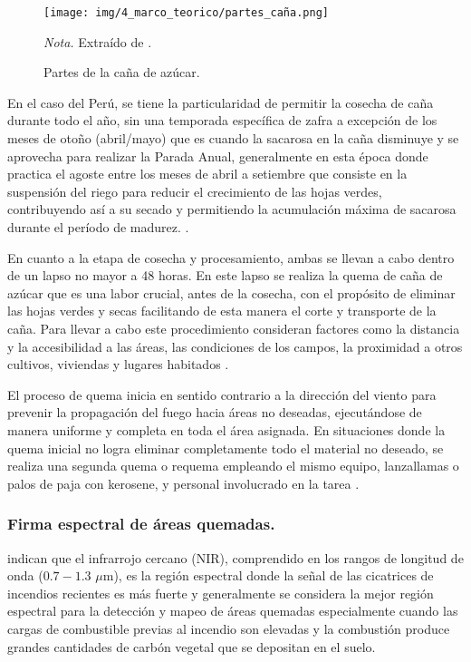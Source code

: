 \begin{figure}[H]
    \centering
    \caption{Partes de la caña de azúcar.}
    \texttt{[image: img/4\_marco\_teorico/partes\_caña.png]}
    \label{fig:quema_cana}
    \begin{flushleft}
        \textit{Nota.} Extraído de \citet{pipicano_alisis_2022}. 
        \vspace{-\baselineskip}
    \end{flushleft}
\end{figure}
En el caso del Perú, se tiene la particularidad de permitir la cosecha de caña durante todo el año, 
sin una temporada específica de zafra a excepción de los meses de otoño (abril/mayo) que es cuando la sacarosa en la caña disminuye y se aprovecha
para realizar la Parada Anual, generalmente  en esta época donde practica el agoste entre los meses de abril a setiembre que consiste en la suspensión 
del riego para reducir el crecimiento de las hojas verdes, contribuyendo así a su secado y permitiendo la acumulación máxima de sacarosa durante el período de madurez.
\citep{helfgott_cultivo_2016}.

En cuanto a la etapa de cosecha y procesamiento, ambas se llevan a cabo dentro de un lapso no mayor a 48 horas. En este lapso se realiza la quema de caña de azúcar que es una labor crucial, antes de la cosecha, con el propósito de eliminar las hojas verdes y secas facilitando de esta manera el corte y transporte de la caña. 
Para llevar a cabo este procedimiento consideran factores como la distancia y la accesibilidad a las áreas, las condiciones 
de los campos, la proximidad a otros cultivos, viviendas y lugares habitados \citep[pp. 1530 - 1536]{casa_grande_saa_2018}. 

El proceso de quema inicia en sentido contrario a la dirección del viento para prevenir la propagación del fuego hacia áreas no deseadas, ejecutándose de manera uniforme y completa en toda el área asignada. 
En situaciones donde la quema inicial no logra eliminar completamente todo el material no deseado, se realiza una segunda quema o requema empleando el mismo equipo, lanzallamas o palos de paja con kerosene, 
y personal involucrado en la tarea \citep[pp. 434 - 436]{san_jacinto_2014}.

\subsubsection{Firma espectral de áreas quemadas.}
\citet{Pereira1999} indican que el infrarrojo cercano (NIR), comprendido en los rangos de longitud de onda ($0.7 - 1.3$ $\mu$m), es la región espectral donde la señal de las cicatrices de incendios recientes es más fuerte y generalmente se considera la mejor región espectral para la detección y mapeo de áreas quemadas especialmente cuando las 
cargas de combustible previas al incendio son elevadas y la combustión produce grandes cantidades de carbón vegetal que se depositan en el suelo. 

